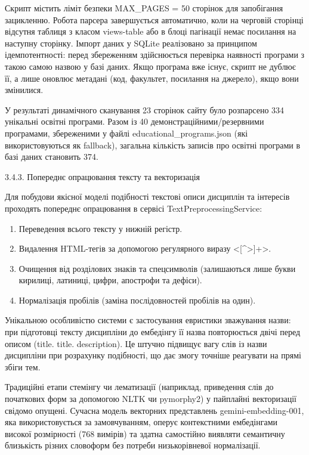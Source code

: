 \documentclass[
]{article}
\begin{document}
Скрипт містить ліміт безпеки MAX\_PAGES = 50 сторінок для запобігання
зацикленню. Робота парсера завершується автоматично, коли на черговій
сторінці відсутня таблиця з класом views-table або в блоці пагінації
немає посилання на наступну сторінку. Імпорт даних у SQLite реалізовано
за принципом ідемпотентності: перед збереженням здійснюється перевірка
наявності програми з такою самою назвою у базі даних. Якщо програма вже
існує, скрипт не дублює її, а лише оновлює метадані (код, факультет,
посилання на джерело), якщо вони змінилися.

У результаті динамічного сканування 23 сторінок сайту було розпарсено
334 унікальні освітні програми. Разом із 40 демонстраційними/резервними
програмами, збереженими у файлі educational\_programs.json (які
використовуються як fallback), загальна кількість записів про освітні
програми в базі даних становить 374.

3.4.3. Попереднє опрацювання тексту та векторизація

Для побудови якісної моделі подібності текстові описи дисциплін та
інтересів проходять попереднє опрацювання в сервісі
TextPreprocessingService:

\begin{enumerate}
\def\labelenumi{\arabic{enumi}.}
\item
  Переведення всього тексту у нижній регістр.
\item
  Видалення HTML-тегів за допомогою регулярного виразу
  \textless{[}\^{}\textgreater{]}+\textgreater.
\item
  Очищення від розділових знаків та спецсимволів (залишаються лише букви
  кирилиці, латиниці, цифри, апострофи та дефіси).
\item
  Нормалізація пробілів (заміна послідовностей пробілів на один).
\end{enumerate}

Унікальною особливістю системи є застосування евристики зважування
назви: при підготовці тексту дисципліни до ембедінгу її назва
повторюється двічі перед описом (title. title. description). Це штучно
підвищує вагу слів із назви дисципліни при розрахунку подібності, що дає
змогу точніше реагувати на прямі збіги тем.

Традиційні етапи стемінгу чи лематизації (наприклад, приведення слів до
початкових форм за допомогою NLTK чи pymorphy2) у пайплайні векторизації
свідомо опущені. Сучасна модель векторних представлень
gemini-embedding-001, яка використовується за замовчуванням, оперує
контекстними ембедінгами високої розмірності (768 вимірів) та здатна
самостійно виявляти семантичну близькість різних словоформ без потреби
низькорівневої нормалізації.
\end{document}
